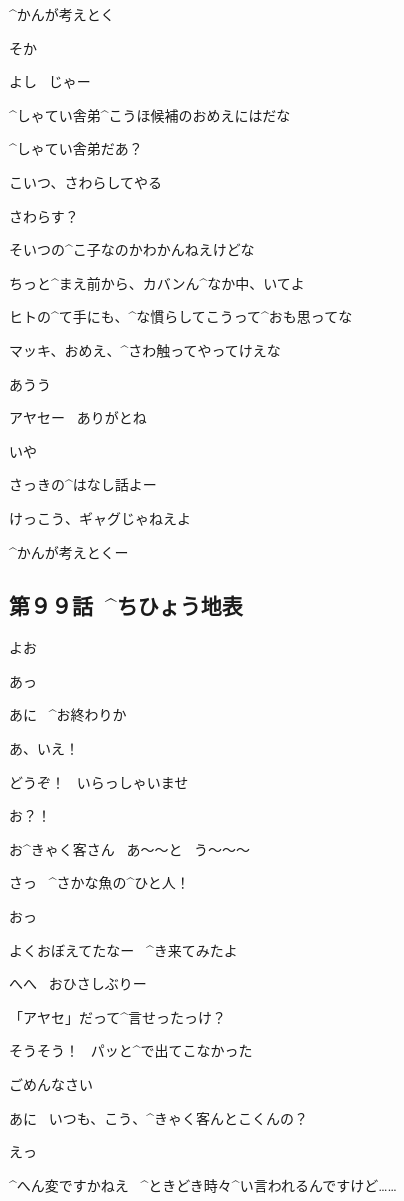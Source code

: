 \page
\M ^{かんが}{考}えとく

\Y そか

\Y よし
\ じゃー

\Y ^{しゃてい}{舎弟}^{こうほ}{候補}のおめえにはだな

\M ^{しゃてい}{舎弟}だあ？

\Y こいつ、さわらしてやる

\M さわらす？

\page[147]
\Y そいつの^{こ}{子}なのかわかんねえけどな

\Y ちっと^{まえ}{前}から、カバンん^{なか}{中}、いてよ

\Y ヒトの^{て}{手}にも、^{な}{慣}らしてこうって^{おも}{思}ってな

\Y マッキ、おめえ、^{さわ}{触}ってやってけえな

\page[149]
\M あうう

\page
\M アヤセー
\ ありがとね

\Y いや

\Y さっきの^{はなし}{話}よー

\Y けっこう、ギャグじゃねえよ

\M ^{かんが}{考}えとくー


\subsection{第９９話\ ^{ちひょう}{地表}}

\page[156]
\Y よお

\A あっ

\Y あに
\ ^{お}{終}わりか

\A あ、いえ！

\A どうぞ！
\ いらっしゃいませ

\page
\A お？！

\A お^{きゃく}{客}さん
\ あ〜〜と
\ う〜〜〜

\A さっ
\ ^{さかな}{魚}の^{ひと}{人}！

\Y おっ

\Y よくおぼえてたなー
\ ^{き}{来}てみたよ

\A へへ
\ おひさしぶりー

\Y 「アヤセ」だって^{言}{せ}ったっけ？

\A そうそう！
\ パッと^{で}{出}てこなかった

\A ごめんなさい

\page
\Y あに
\ いつも、こう、^{きゃく}{客}んとこくんの？

\A えっ

\A ^{へん}{変}ですかねえ
\ ^{ときどき}{時々}^{い}{言}われるんですけど……

